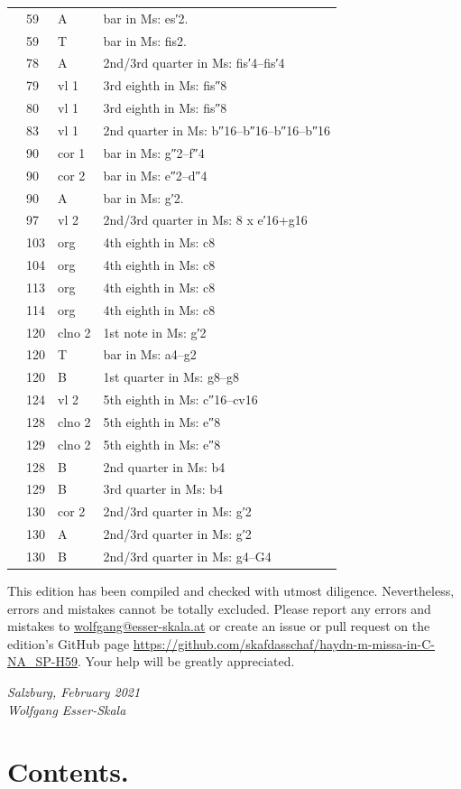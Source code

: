 \documentclass[parskip=full]{scrreprt}
\newif\iftemplate\templatetrue
\begin{document}
\begin{longtable}{lll L{10cm}}
	  & 59   & A       & bar in Ms: es′2. \\
	  & 59   & T       & bar in Ms: fis2. \\
	  & 78   & A       & 2nd/3rd quarter in Ms: fis′4–fis′4 \\
	  & 79   & vl 1    & 3rd eighth in Ms: fis″8 \\
	  & 80   & vl 1    & 3rd eighth in Ms: fis″8 \\
	  & 83   & vl 1    & 2nd quarter in Ms: b″16–b″16–b″16–b″16 \\
	  & 90   & cor 1   & bar in Ms: g″2–f″4 \\
	  & 90   & cor 2   & bar in Ms: e″2–d″4 \\
	  & 90   & A       & bar in Ms: g′2. \\
	  & 97   & vl 2    & 2nd/3rd quarter in Ms: 8 x e′16+g16 \\
	  & 103  & org     & 4th eighth in Ms: c8 \\
	  & 104  & org     & 4th eighth in Ms: c8 \\
	  & 113  & org     & 4th eighth in Ms: c8 \\
	  & 114  & org     & 4th eighth in Ms: c8 \\
	  & 120  & clno 2  & 1st note in Ms: g′2 \\
	  & 120  & T       & bar in Ms: a4–g2 \\
	  & 120  & B       & 1st quarter in Ms: g8–g8 \\
	  & 124  & vl 2    & 5th eighth in Ms: c″16–cv16 \\
	  & 128  & clno 2  & 5th eighth in Ms: e″8 \\
	  & 129  & clno 2  & 5th eighth in Ms: e″8 \\
	  & 128  & B       & 2nd quarter in Ms: b4 \\
	  & 129  & B       & 3rd quarter in Ms: b4 \\
	  & 130  & cor 2   & 2nd/3rd quarter in Ms: g′2 \\
	  & 130  & A       & 2nd/3rd quarter in Ms: g′2 \\
	  & 130  & B       & 2nd/3rd quarter in Ms: g4–G4 \\
	\bottomrule
\end{longtable}


This edition has been compiled and checked with utmost diligence. Nevertheless, errors and mistakes cannot be totally excluded. Please report any errors and mistakes to \url{wolfgang@esser-skala.at} or create an issue or pull request on the edition’s GitHub page \url{https://github.com/skafdasschaf/haydn-m-missa-in-C-NA_SP-H59}. Your help will be greatly appreciated.

\bigskip
\textit{Salzburg, February 2021\\
Wolfgang Esser-Skala}

\cleardoublepage
\chapter*{Contents.}




\cleardoublepage
\fi

\iftemplate

\fi
\end{document}
